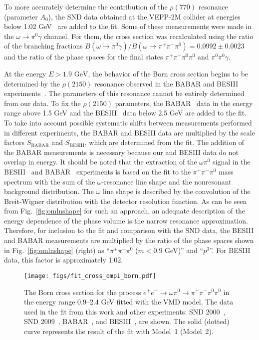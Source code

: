 \documentclass[twocolumn,aps,prd,floatfix,nofootinbib,superscriptaddress]{revtex4-2}
\begin{document}
To more accurately determine the contribution of the $\rho(770)$ resonance (parameter $A_0$), the SND data obtained at the VEPP-2M collider at energies below 1.02 GeV~\cite{snd2000b,snd2000a,snd2009} are added to the fit.
Some of these measurements were made in the \( \omega \to \pi^0\gamma \) channel.
For them, the cross section was recalculated using the ratio of the branching fractions \( B(\omega \to \pi^0 \gamma) / B(\omega \to \pi^+\pi^-\pi^0) = 0.0992 \pm 0.0023 \)~\cite{snd2016_pig} and the ratio of the phase spaces for the final states $\pi^+\pi^-\pi^0\pi^0$ and $\pi^0\pi^0\gamma$.

At the energy \( E > 1.9 \text{ GeV} \), the behavior of the Born cross section begins to be determined by the $\rho(2150)$ resonance observed in the BABAR and BESIII experiments~\cite{babar17,bes2021,qin2022}.
The parameters of this resonance cannot be entirely determined from our data.
To fix the $\rho(2150)$ parameters, the BABAR~\cite{babar17} data in the energy range above 1.5 GeV and the BESIII~\cite{bes2021} data below 2.5 GeV are added to the fit.
To take into account possible systematic shifts between measurements performed in different experiments, the BABAR and BESIII data are multiplied by the scale factors $S_\text{BABAR}$ and $S_\text{BESIII}$, which are determined from the fit.
The addition of the BABAR measurements is necessary because our and BESIII data do not overlap in energy.
It should be noted that the extraction of the $\omega\pi^0$ signal in the BESIII~\cite{bes2021} and BABAR~\cite{babar17} experiments is based on the fit to the $\pi^+\pi^-\pi^0$ mass spectrum with the sum of the $\omega$-resonance line shape and the nonresonant background distribution.
The $\omega$ line shape is described by the convolution of the Breit-Wigner distribution with the detector resolution function.
As can be seen from Fig.~\ref{fig:omlnshape} for such an approach, an adequate description of the energy dependence of the phase volume is the narrow resonance approximation.
Therefore, for inclusion to the fit and comparison with the SND data, the BESIII and BABAR measurements are multiplied by the ratio of the phase spaces shown in Fig.~\ref{fig:omlnshape} (right) as ``$\pi^+\pi^-\pi ^0$ ($m < 0.9$ GeV)'' and ``$p^3$''.
For BESIII data, this factor is approximately 1.02.
\begin{figure}
\centering
\texttt{[image: figs/fit\_cross\_ompi\_born.pdf]}%
\caption{
	The Born cross section for the process \( e^+e^- \to \omega\pi^0 \to \pi^+\pi^-\pi^0\pi^0 \) in the energy range 0.9--2.4 GeV fitted with the VMD model.
	The data used in the fit from this work and other experiments: SND 2000~\cite{snd2000b,snd2000a}, SND 2009~\cite{snd2009}, BABAR~\cite{babar17}, and BESIII~\cite{bes2021}, are shown.
	The solid (dotted) curve represents the result of the fit with Model~1 (Model~2).
}
\label{fig:crossfit}
\end{figure}
\end{document}
